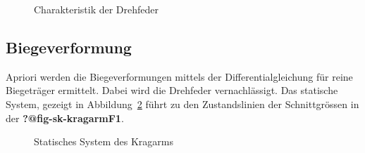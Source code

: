 \documentclass[
  12pt,
  letterpaper,
  egregdoesnotlikesansseriftitles]{scrreprt}
\begin{document}
\begin{figure}[H]


\caption{\label{fig-springcharacteristic}Charakteristik der Drehfeder}

\end{figure}%

\subsection{Biegeverformung}\label{biegeverformung}

Apriori werden die Biegeverformungen mittels der Differentialgleichung
für reine Biegeträger ermittelt. Dabei wird die Drehfeder
vernachlässigt. Das statische System, gezeigt in
Abbildung~\ref{fig-kragarm-sys} führt zu den Zustandslinien der
Schnittgrössen in der \textbf{?@fig-sk-kragarmF1}.

\begin{figure}[H]


\caption{\label{fig-kragarm-sys}Statisches System des Kragarms}

\end{figure}%
\end{document}
